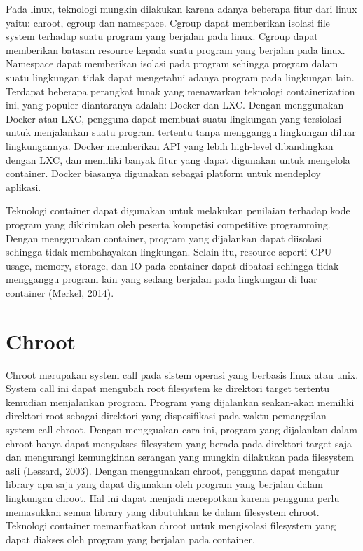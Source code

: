 \par Pada linux, teknologi mungkin dilakukan karena adanya beberapa fitur dari linux yaitu: chroot, cgroup dan namespace. Cgroup dapat memberikan isolasi file system terhadap suatu program yang berjalan pada linux. Cgroup dapat memberikan batasan resource kepada suatu program yang berjalan pada linux. Namespace dapat memberikan isolasi pada program sehingga program dalam suatu lingkungan tidak dapat mengetahui adanya program pada lingkungan lain. Terdapat beberapa perangkat lunak yang menawarkan teknologi containerization ini, yang populer diantaranya adalah: Docker dan LXC. Dengan menggunakan Docker atau LXC, pengguna dapat membuat suatu lingkungan yang tersiolasi untuk menjalankan suatu program tertentu tanpa mengganggu lingkungan diluar lingkungannya. Docker memberikan API yang lebih high-level dibandingkan dengan LXC, dan memiliki banyak fitur yang dapat digunakan untuk mengelola container. Docker biasanya digunakan sebagai platform untuk mendeploy aplikasi.

\par Teknologi container dapat digunakan untuk melakukan penilaian terhadap kode program yang dikirimkan oleh peserta kompetisi competitive programming. Dengan menggunakan container, program yang dijalankan dapat diisolasi sehingga tidak membahayakan lingkungan. Selain itu, resource seperti CPU usage, memory, storage, dan IO pada container dapat dibatasi sehingga tidak mengganggu program lain yang sedang berjalan pada lingkungan di luar container (Merkel, 2014).

\section{Chroot}

\par Chroot merupakan system call pada sistem operasi yang berbasis linux atau unix. System call ini dapat mengubah root filesystem ke direktori target tertentu kemudian menjalankan program. Program yang dijalankan seakan-akan memiliki direktori root sebagai direktori yang dispesifikasi pada waktu pemanggilan system call chroot. Dengan mengguakan cara ini, program yang dijalankan dalam chroot hanya dapat mengakses filesystem yang berada pada direktori target saja dan mengurangi kemungkinan serangan yang mungkin dilakukan pada filesystem asli (Lessard, 2003). Dengan menggunakan chroot, pengguna dapat mengatur library apa saja yang dapat digunakan oleh program yang berjalan dalam lingkungan chroot. Hal ini dapat menjadi merepotkan karena pengguna perlu memasukkan semua library yang dibutuhkan ke dalam filesystem chroot. Teknologi container memanfaatkan chroot untuk mengisolasi filesystem yang dapat diakses oleh program yang berjalan pada container.

